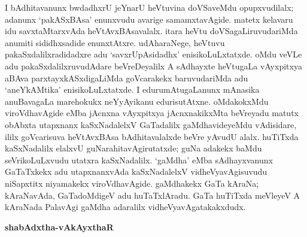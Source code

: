 I bAdhitavanunx bwdadhxrU jeYnarU heVtuvina doVSaveMdu opupxvudilalx; adanunx `pakASxBAsa' enunxvudu avarige samamxtavAgide. matetx kelavaru idu savxtaMtarxvAda heVtAvxBAsavalalx. itara heVtu doVSagaLiruvudariMda anumiti sididhxsadide enunxtAtxre. udAharaNege, heVtuvu pakaSxdalilxradidadxre adu `savxrUpAsidadhx' enisikoLuLxtatxde. oMdu veVLe adu pakaSxdalilxruvudAdare beVreDeyalilx A sAdhayxte heVtugaLa vAyxpitxya aBAva parxtayxkASxdigaLiMda goVcarakekx baruvudariMda adu `aneYkAMtika' enisikoLuLxtatxde. I edurumAtugaLanunx mAnasika anuBavagaLa marehokukx neYyAyikanu edurisutAtxne. oMdakokxMdu viroVdhavAgide eMba jAcnxna vAyxpitxya jAcnxnakikxMta beVreyadu matutx obAbxta utapxnanx kaSxNadalelxV GaTadalilx gaMdhavideyeMdu vAdisidare, ililx goVcarisuva heVtAvxBAsa bAdhitavalalxde beVre yAvudU alalx. huTiTxda kaSxNadalilx elalxvU guNarahitavAgirutatxde; guNa adakekx baMdu seVrikoLuLxvudu utatxra kaSxNadalilx. `gaMdha' eMba sAdhayxvanunx GaTaTxkekx adu utapxnanxvAda kaSxNadalelxV vidheVyavAgisuvudu niSapxtitx niyamakekx viroVdhavAgide. gaMdhakekx GaTa kAraNa; kAraNavAda, GaTadoMdigeV adu huTaTxlAradu. GaTa huTiTxda meVleyeV A kAraNada PalavAgi gaMdha adaralilx vidheVyavAgatakakxdudx.

\bigskip
\begin{center}
{\Large\bf shabAdxtha-vAkAyxthaR}
\end{center}

